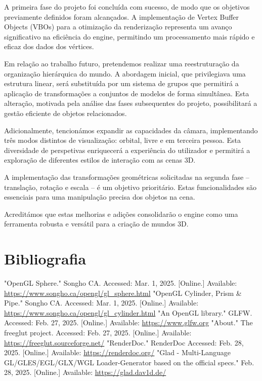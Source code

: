 \documentclass[12pt, a4paper]{article}
\begin{document}
A primeira fase do projeto foi concluída com sucesso, de modo que os objetivos previamente definidos
foram alcançados. A implementação de Vertex Buffer Objects (VBOs) para a otimização da renderização
representa um avanço significativo na eficiência do engine, permitindo um processamento mais rápido
e eficaz dos dados dos vértices.

Em relação ao trabalho futuro, pretendemos realizar uma reestruturação da organização hierárquica do
mundo. A abordagem inicial, que privilegiava uma estrutura linear, será substituída por um sistema
de grupos que permitirá a aplicação de transformações a conjuntos de modelos de forma simultânea.
Esta alteração, motivada pela análise das fases subsequentes do projeto, possibilitará a gestão
eficiente de objetos relacionados.

Adicionalmente, tencionámos expandir as capacidades da câmara, implementando três modos distintos de
visualização: orbital, livre e em terceira pessoa. Esta diversidade de perspetivas enriquecerá a
experiência do utilizador e permitirá a exploração de diferentes estilos de interação com as cenas
3D.

A implementação das transformações geométricas solicitadas na segunda fase – translação, rotação e
escala – é um objetivo prioritário. Estas funcionalidades são essenciais para uma manipulação
precisa dos objetos na cena.

Acreditámos que estas melhorias e adições consolidarão o engine como uma ferramenta robusta e
versátil para a criação de mundos 3D.

\begingroup
\section{Bibliografia}
\renewcommand{\section}[2]{}

\begin{thebibliography}{9}
        "OpenGL Sphere."{} Songho CA. Accessed: Mar. 1, 2025. [Online.] Available:
        \url{https://www.songho.ca/opengl/gl_sphere.html}
        "OpenGL Cylinder, Prism \& Pipe."{} Songho CA. Accessed: Mar. 1, 2025. [Online.] Available:
        \url{https://www.songho.ca/opengl/gl_cylinder.html}
        "An OpenGL library."{} GLFW. Accessed: Feb. 27, 2025. [Online.] Available:
        \url{https://www.glfw.org}
        "About."{} The freeglut project. Accessed: Feb. 27, 2025. [Online.] Available:
        \url{https://freeglut.sourceforge.net/}
        "RenderDoc."{} RenderDoc Accessed: Feb. 28, 2025. [Online.] Available:
        \url{https://renderdoc.org/}
        "Glad - Multi-Language GL/GLES/EGL/GLX/WGL Loader-Generator based on the official specs."{}
        Feb. 28, 2025. [Online.] Available: \url{https://glad.dav1d.de/}
\end{thebibliography}
\endgroup
\end{document}
